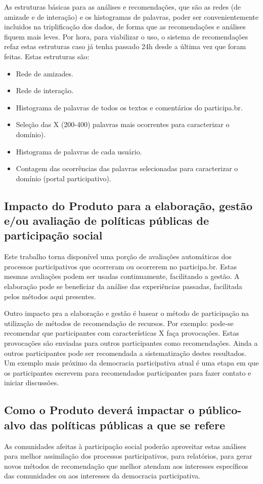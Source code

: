 \documentclass[12pt]{article}
\begin{document}
As estruturas básicas para as análises e recomendações, que são as redes (de amizade e de interação) e os histogramas de palavras, poder ser convenientemente incluidos na triplificação dos dados, de forma que as recomendações e análises fiquem mais leves. Por hora, para viabilizar o uso, o sistema de recomendações refaz estas estruturas caso já tenha passado 24h desde a última vez que foram feitas. Estas estruturas são:
\begin{itemize}
    \item Rede de amizades.
    \item Rede de interação.
    \item Histograma de palavras de todos os textos e comentários do participa.br.
    \item Seleção das X (200-400) palavras mais ocorrentes para caracterizar o domínio).
    \item Histograma de palavras de cada usuário.
    \item Contagem das ocorrências das palavras selecionadas para caracterizar o domínio (portal participativo).
\end{itemize}

\subsection{Impacto do Produto para a elaboração, gestão e/ou avaliação de políticas públicas de participação social}
Este trabalho torna disponível uma porção de avaliações automáticas dos processos participativos que ocorreram ou ocorrerem no participa.br. Estas mesmas avaliações podem ser usadas continuamente, facilitando a gestão. A elaboração pode se beneficiar da análise das experiências passadas, facilitada pelos métodos aqui presentes.

Outro impacto pra a elaboração e gestão é basear o método de participação na utilização de métodos de recomendação de recursos. Por exemplo: pode-se recomendar que participantes com características X faça provocações. Estas provocações são enviadas para outros participantes como recomendações. Ainda a outros participantes pode ser recomendada a sistematização destes resultados. Um exemplo mais próximo da democracia participativa atual é uma etapa em que os participantes escrevem para recomendados participantes para fazer contato e iniciar discussões.

\subsection{Como o Produto deverá impactar o público-alvo das políticas públicas a que se refere}
As comunidades afeitas à participação social poderão aproveitar estas análises para melhor assimilação dos processos participativos, para relatórios, para gerar novos métodos de recomendação que melhor atendam aos interesses específicos das comunidades ou aos interesses da democracia participativa.
\end{document}
